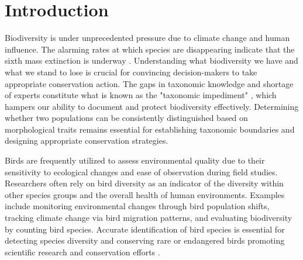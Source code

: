 \documentclass[a4paper,12pt]{report}
\begin{document}
\newpage
\tableofcontents



\newpage
\cleardoublepage %
\setcounter{page}{1} %

\chapter{Introduction}

Biodiversity is under unprecedented pressure due to climate change and human influence. The alarming rates at which species are disappearing indicate that the sixth mass extinction is underway \citep{Ceballos2017}. Understanding what biodiversity we have and what we stand to lose is crucial for convincing decision-makers to take appropriate conservation action. The gaps in taxonomic knowledge and shortage of experts constitute what is known as the "taxonomic impediment" \citep{taxonomicimpediment}, which hampers our ability to document and protect biodiversity effectively. Determining whether two populations can be consistently distinguished based on morphological traits remains essential for establishing taxonomic boundaries and designing appropriate conservation strategies.

Birds are frequently utilized to assess environmental quality due to their sensitivity to ecological changes and ease of observation during field studies. Researchers often rely on bird diversity as an indicator of the diversity within other species groups and the overall health of human environments. Examples include monitoring environmental changes through bird population shifts, tracking climate change via bird migration patterns, and evaluating biodiversity by counting bird species. Accurate identification of bird species is essential for detecting species diversity and conserving rare or endangered birds promoting scientific research and conservation efforts \citep{ani13020264}.

\end{document}
